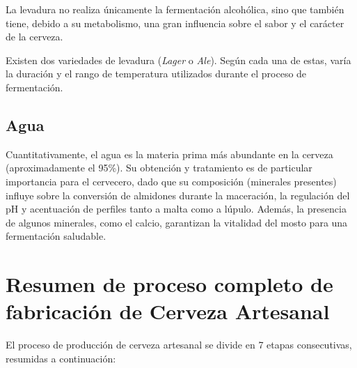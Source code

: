             \par La levadura no realiza únicamente la fermentación alcohólica, sino que también tiene, debido a su metabolismo, una gran influencia sobre el sabor y el carácter de la cerveza.
            
            \par Existen dos variedades de levadura (\textit{Lager} o \textit{Ale}). Según cada una de estas, varía la duración y el rango de temperatura utilizados durante el proceso de fermentación.
            
        \subsection{Agua}
            \par Cuantitativamente, el agua es la materia prima más abundante en la cerveza (aproximadamente el 95\%). Su obtención y tratamiento es de particular importancia para el cervecero, dado que su composición (minerales presentes) influye sobre la conversión de almidones durante la maceración, la regulación del pH y acentuación de perfiles tanto a malta como a lúpulo. Además, la presencia de algunos minerales, como el calcio, garantizan la vitalidad del mosto para una fermentación saludable.
            
    \section{Resumen de proceso completo de fabricación de Cerveza Artesanal}
        \par El proceso de producción de cerveza artesanal se divide en 7 etapas consecutivas, resumidas a continuación:
        
